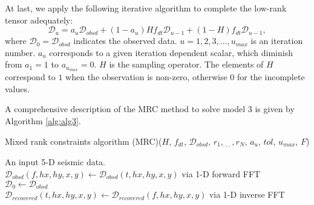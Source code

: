 At last, we apply the following iterative algorithm to complete the low-rank tensor adequately:
\begin{equation}
\mathcal{D}_u = a_u\mathcal{D}_{obsd} + (1 - a_u){H}f_{dt}\mathcal{D}_{u-1} + (1 - {H})f_{dt}\mathcal{D}_{u-1},
\end{equation}  
where $\mathcal{D}_0=\mathcal{D}_{obsd}$ indicates the observed data. $u=1,2,3,...,u_{max}$ is an iteration number. $a_{u}$ corresponds to a given iteration dependent scalar, which diminish from $a_1=1$ to $a_{u_{max}}=0$. ${H}$ is the sampling operator. The elements of ${H}$ correspond to $ 1 $ when the observation is non-zero, otherwise $0$ for the incomplete values. 

A comprehensive description of the MRC method to solve model 3 is given by Algorithm \ref{alg:alg3}.

\begin{algorithm}[H] \caption{Mixed rank constraints algorithm (MRC)(${H}$, ${f_{dt}}$, $\mathcal{D}_{obsd}$, $ r_1,_{\cdot\cdot\cdot},r_N $, {$a_{u}$}, $tol$, $u_{max}$, ${F}$)}
	\label{alg:alg3}
	\begin{algorithmic}[1] 
\Require An input 5-D seismic data.\\
$\mathcal{D}_{obsd}(f, hx, hy, x, y)\leftarrow \mathcal{D}_{obsd}(t, hx, hy, x, y)$ via 1-D forward FFT\\		    
$\mathcal{D}_0\leftarrow\mathcal{D}_{obsd}$\;
		\EndFor\\		
		$\mathcal{D}_{recovered}(t,hx, hy, x, y)\leftarrow \mathcal{D}_{recovered}(f,hx, hy, x, y)$ via 1-D inverse FFT\;
	\end{algorithmic}
\end{algorithm}
	

